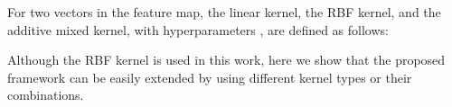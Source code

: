 \documentclass[runningheads]{llncs}
\begin{document}
For two vectors  in the feature map, the linear kernel, the RBF kernel, and the additive mixed kernel, with hyperparameters , are defined as follows:

Although the RBF kernel is used in this work, here we show that the proposed framework can be easily extended by using different kernel types or their combinations.



\end{document}

